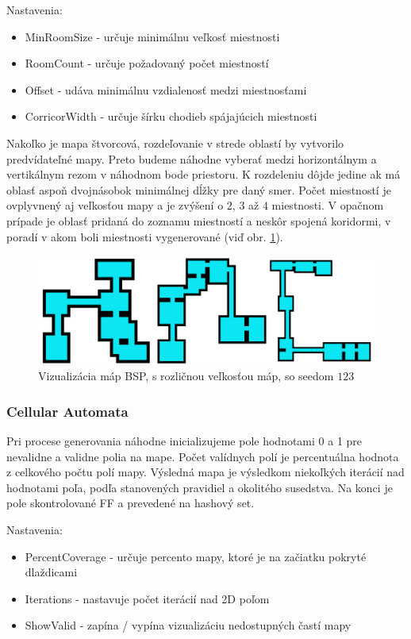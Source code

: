 \noindent Nastavenia:

\begin{itemize}
    \item MinRoomSize - určuje minimálnu veľkosť miestnosti
    \item RoomCount - určuje požadovaný počet miestností
    \item Offset - udáva minimálnu vzdialenosť medzi miestnosťami
    \item CorricorWidth - určuje šírku chodieb spájajúcich miestnosti
\end{itemize}

Nakoľko je mapa štvorcová, rozdeľovanie v strede oblastí by vytvorilo predvídateľné mapy. Preto budeme náhodne vyberať medzi horizontálnym a vertikálnym rezom v náhodnom bode priestoru. K rozdeleniu dôjde jedine ak má oblasť aspoň dvojnásobok minimálnej dĺžky pre daný smer. Počet miestností je ovplyvnený aj veľkosťou mapy a je zvýšení o $2$, $3$ až $4$ miestnosti. V opačnom prípade je oblasť pridaná do zoznamu miestností a neskôr spojená koridormi, v poradí v akom boli miestnosti vygenerované (viď obr. \ref{fig:bsp}).

\begin{figure} [H]
    \centering
    \includegraphics[width=0.75\linewidth]{obrazky-figures/bsp.png}
    \caption{Vizualizácia máp BSP, s rozličnou veľkosťou máp, so seedom $123$}
    \label{fig:bsp}
\end{figure}

\subsubsection*{Cellular Automata}

Pri procese generovania náhodne inicializujeme pole hodnotami 0 a 1 pre nevalidne a validne polia na mape. Počet valídnych polí je percentuálna hodnota z celkového počtu polí mapy. Výsledná mapa je výsledkom niekoľkých iterácií nad hodnotami poľa, podľa stanovených pravidiel a okolitého susedstva. Na konci je pole skontrolované FF a prevedené na hashový set.

\noindent Nastavenia:

\begin{itemize}
    \item PercentCoverage - určuje percento mapy, ktoré je na začiatku pokryté dlaždicami
    \item Iterations - nastavuje počet iterácií nad 2D poľom
    \item ShowValid - zapína / vypína vizualizáciu nedostupných častí mapy
\end{itemize}

